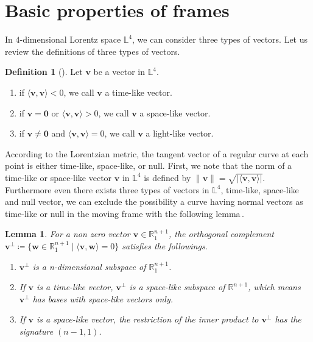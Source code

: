 \documentclass[a4paper]{amsart}
\newtheorem{lemma}[theorem]{Lemma}
\theoremstyle{definition}
\newtheorem{definition}[theorem]{Definition}
\theoremstyle{remark}
\newcommand{\RR}{\mathbb{R}}
\newcommand{\LL}{\mathbb{L}}
\numberwithin{equation}{section}
\begin{document}
\section{Basic properties of frames}\label{sec:pre}
In $4$-dimensional Lorentz space $\LL^{4}$, we can consider three types of vectors. Let us review the definitions of three types of vectors.
\begin{definition}[{\cite{bo}}]
Let $\bm{v}$ be a vector in $\LL^{4}$.
\begin{enumerate}
\item if \(\langle \bm{v}, \bm{v}\rangle<0\), we call \(\bm{v}\) a time-like vector.
\item if \(\bm{v}=\bm{0}\) or \(\langle \bm{v}, \bm{v}\rangle>0\), we call \(\bm{v}\) a space-like vector.
\item if \(\bm{v}\neq\bm{0}\) and \(\langle \bm{v}, \bm{v}\rangle=0\), we call \(\bm{v}\) a light-like vector.
\end{enumerate}    
\end{definition}
According to the Lorentzian metric, the tangent vector of a regular curve at each point is 
either time-like, space-like, or null. First, we note that the norm of a time-like or space-like vector $\bm{v}$ in $\LL^{4}$ is defined by $\|\bm{v}\|=\sqrt{|\langle\bm{v},\bm{v}\rangle|}$. Furthermore even there exists three types of vectors in $\LL^{4}$, time-like, space-like and null vector, we can exclude the possibility a curve having normal vectors as time-like or null in the moving frame with the following lemma\,\cite{YM}.
\begin{lemma}\label{lorentz}
    For a non zero vector $\bm{v}\in\RR^{n+1}_{1}$, the orthogonal complement $\bm{v}^{\perp} \coloneqq\{\bm{w}\in\RR^{n+1}_{1}\mid \langle\bm{v}, \bm{w}\rangle=0\}$ satisfies the followings.
    \begin{enumerate}
    \item $\bm{v}^{\perp}$ is a n-dimensional subspace of $\RR^{n+1}_{1}$.
    \item If $\bm{v}$ is a time-like vector, $\bm{v}^{\perp}$ is a space-like subspace of $\RR^{n+1}$, which means $\bm{v}^{\perp}$ has bases with space-like vectors only.
    \item If $\bm{v}$ is a space-like vector, the restriction of the inner product to $\bm{v}^{\perp}$ has the signature $(n-1, 1)$.
    \end{enumerate}
    \end{lemma}
\end{document}
